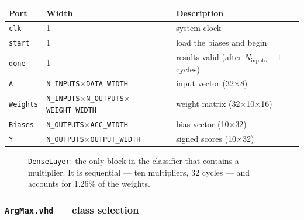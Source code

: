 \documentclass[11pt,a4paper]{article}
\begin{document}
\begin{center}
\small
\begin{tabularx}{\linewidth}{@{}llL@{}}
\toprule
\textbf{Port} & \textbf{Width} & \textbf{Description} \\
\midrule
\texttt{clk}     & 1  & system clock \\
\texttt{start}   & 1  & load the biases and begin \\
\texttt{done}    & 1  & results valid (after $N_{\text{inputs}}{+}1$ cycles) \\
\texttt{A}       & \texttt{N\_INPUTS}$\times$\texttt{DATA\_WIDTH} & input vector (32$\times$8) \\
\texttt{Weights} & \texttt{N\_INPUTS}$\times$\texttt{N\_OUTPUTS}$\times$\texttt{WEIGHT\_WIDTH} & weight matrix (32$\times$10$\times$16) \\
\texttt{Biases}  & \texttt{N\_OUTPUTS}$\times$\texttt{ACC\_WIDTH} & bias vector (10$\times$32) \\
\texttt{Y}       & \texttt{N\_OUTPUTS}$\times$\texttt{OUTPUT\_WIDTH} & signed scores (10$\times$32) \\
\bottomrule
\end{tabularx}
\end{center}

\begin{figure}[H]
\centering
{}
\caption{\texttt{DenseLayer}: the only block in the classifier that contains a
  multiplier. It is sequential --- ten multipliers, 32 cycles --- and accounts
  for 1.26\% of the weights.}
\label{fig:denselayer}
\end{figure}

\subsubsection{\texttt{ArgMax.vhd} --- class selection}
\label{sub:argmax}
\end{document}
